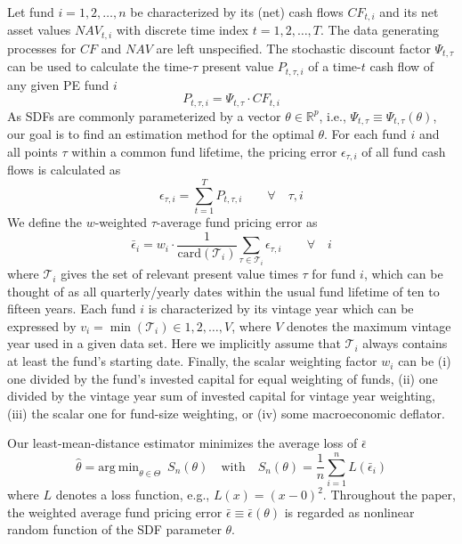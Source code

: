 \documentclass[12pt]{article}
\begin{document}
Let fund $i=1,2,\dots,n$ be characterized by its (net) cash flows ${CF}_{t,i}$ and its net asset values ${NAV}_{t,i}$ with discrete time index $t=1,2,\dots,T$.
The data generating processes for $CF$ and $NAV$ are left unspecified.
The stochastic discount factor $\Psi_{t,\tau}$ can be used to calculate the time-$\tau$ present value $P_{t,\tau,i}$ of a time-$t$ cash flow of any given PE fund $i$
\begin{equation}
\label{eq:price}
P_{t,\tau,i} = \Psi_{t,\tau} \cdot CF_{t,i}
\end{equation}
As SDFs are commonly parameterized by a vector $\theta \in \mathbb{R}^p$, i.e., $\Psi_{t,\tau} \equiv \Psi_{t,\tau} (\theta)$, our goal is to find an estimation method for the optimal $\theta$.
For each fund $i$ and all points $\tau$ within a common fund lifetime, the pricing error $\epsilon_{\tau,i}$ of all fund cash flows is calculated as
\begin{equation}
\label{eq:pricing_error}
\epsilon_{\tau,i} = \sum_{t=1}^T P_{t,\tau,i} 
\qquad \forall \quad \tau,i
\end{equation}
We define the $w$-weighted $\tau$-average fund pricing error as
\begin{equation}
\label{eq:average_pricing_error}
\bar{\epsilon}_{i} =
w_{i} \cdot
\frac{1}{\mathrm{card}( \mathcal{T}_{i})}
\sum_{\tau \in \mathcal{T}_{i}}
\epsilon_{\tau,i}
\qquad \forall \quad i
\end{equation}
where $\mathcal{T}_i$ gives the set of relevant present value times $\tau$ for fund $i$, which can be thought of as all quarterly/yearly dates within the usual fund lifetime of ten to fifteen years.
Each fund $i$ is characterized by its vintage year which can be expressed by $v_{i}=\min(\mathcal{T}_i) \in 1,2,\dots,V$, where $V$ denotes the maximum vintage year used in a given data set.
Here we implicitly assume that $\mathcal{T}_i$ always contains at least the fund's starting date.
Finally, the scalar weighting factor $w_i$ can be (i) one divided by the fund's invested capital for equal weighting of funds, (ii) one divided by the vintage year sum of invested capital for vintage year weighting, (iii) the scalar one for fund-size weighting, or (iv) some macroeconomic deflator.

Our least-mean-distance estimator minimizes the average loss of $\bar{\epsilon}$
\begin{equation}
\label{eq:estimator}
\hat{\theta} = 
\mathrm{arg \ min}_{\theta \in \Theta}
\enspace
S_n(\theta)
\quad
\mathrm{with}
\quad
S_n(\theta) = 
\frac{1}{n}
\sum_{i=1}^n
L \left( \bar{\epsilon}_{i} \right) 
\end{equation}
where $L$ denotes a loss function, e.g., $L(x)=(x-0)^2$.
Throughout the paper, the weighted average fund pricing error $\bar{\epsilon} \equiv \bar{\epsilon}(\theta)$ is regarded as nonlinear random function of the SDF parameter $\theta$.
\end{document}
